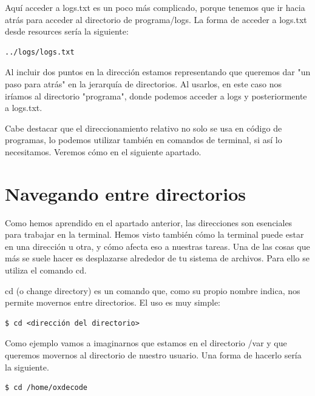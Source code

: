Aquí acceder a logs.txt es un poco más complicado, porque tenemos que ir hacia atrás para acceder al directorio de programa/logs. La forma de acceder a logs.txt desde resources sería la siguiente:

\begin{tcolorbox-code}
\begin{lstlisting}
../logs/logs.txt
\end{lstlisting}
\end{tcolorbox-code}

Al incluir dos puntos en la dirección estamos representando que queremos dar "un paso para atrás" en la jerarquía de directorios. Al usarlos, en este caso nos iríamos al directorio "programa", donde podemos acceder a logs y posteriormente a logs.txt.

Cabe destacar que el direccionamiento relativo no solo se usa en código de programas, lo podemos utilizar también en comandos de terminal, si así lo necesitamos. Veremos cómo en el siguiente apartado.

\section{Navegando entre directorios}
Como hemos aprendido en el apartado anterior, las direcciones son esenciales para trabajar en la terminal. Hemos visto también cómo la terminal puede estar en una dirección u otra, y cómo afecta eso a nuestras tareas. Una de las cosas que más se suele hacer es desplazarse alrededor de tu sistema de archivos. Para ello se utiliza el comando cd.

cd (o change directory) es un comando que, como su propio nombre indica, nos permite movernos entre directorios. El uso es muy simple:

\begin{tcolorbox-code}
\begin{lstlisting}
$ cd <dirección del directorio>
\end{lstlisting}
\end{tcolorbox-code}

Como ejemplo vamos a imaginarnos que estamos en el directorio /var y que queremos movernos al directorio de nuestro usuario. Una forma de hacerlo sería la siguiente.

\begin{tcolorbox-code}
\begin{lstlisting}
$ cd /home/oxdecode
\end{lstlisting}
\end{tcolorbox-code}

